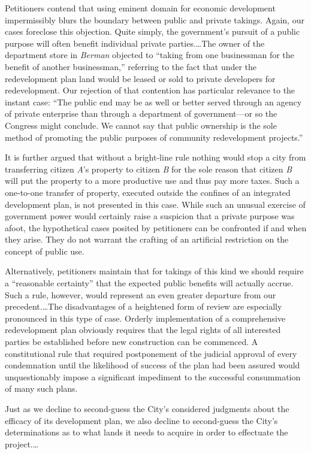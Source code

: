 Petitioners contend that using eminent domain for economic development
impermissibly blurs the boundary between public and private takings. Again, our
cases foreclose this objection. Quite simply, the government's pursuit of a
public purpose will often benefit individual private parties.\ldots The owner of
the department store in \textit{Berman} objected to ``taking from one
businessman for the benefit of another businessman,'' referring to the fact that
under the redevelopment plan land would be leased or sold to private developers
for redevelopment. Our rejection of that contention has particular relevance to
the instant case: ``The public end may be as well or better served through an
agency of private enterprise than through a department of government---or so the
Congress might conclude. We cannot say that public ownership is the sole method
of promoting the public purposes of community redevelopment projects.'' 

It is further argued that without a bright-line rule nothing would stop a city
from transferring citizen \textit{A}'s property to citizen \textit{B} for the
sole reason that citizen \textit{B} will put the property to a more productive
use and thus pay more taxes. Such a one-to-one transfer of property, executed
outside the confines of an integrated development plan, is not presented in this
case. While such an unusual exercise of government power would certainly raise a
suspicion that a private purpose was afoot, the hypothetical cases posited by
petitioners can be confronted if and when they arise. They do not warrant the
crafting of an artificial restriction on the concept of public use.

Alternatively, petitioners maintain that for takings of this kind we should
require a ``reasonable certainty'' that the expected public benefits will
actually accrue. Such a rule, however, would represent an even greater departure
from our precedent.\ldots The disadvantages of a heightened form of review are
especially pronounced in this type of case. Orderly implementation of a
comprehensive redevelopment plan obviously requires that the legal rights of all
interested parties be established before new construction can be commenced. A
constitutional rule that required postponement of the judicial approval of every
condemnation until the likelihood of success of the plan had been assured would
unquestionably impose a significant impediment to the successful consummation of
many such plans.

Just as we decline to second-guess the City's considered judgments about the
efficacy of its development plan, we also decline to second-guess the City's
determinations as to what lands it needs to acquire in order to effectuate the
project.\ldots

